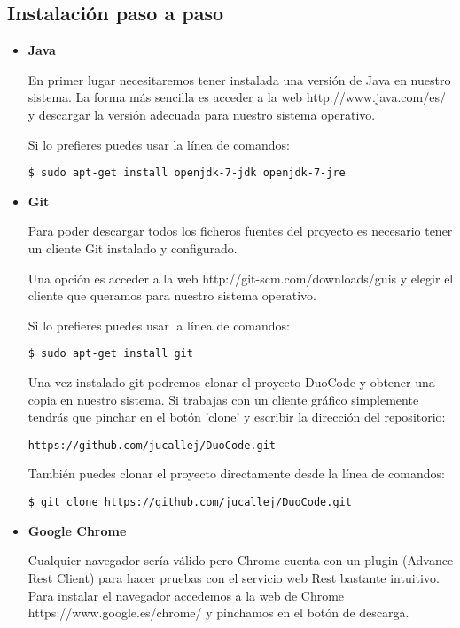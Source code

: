 \subsection{Instalación paso a paso}
\begin{itemize}
\item \textbf{Java}

En primer lugar necesitaremos tener instalada una versión de Java en nuestro sistema. La forma más sencilla es acceder a la web http://www.java.com/es/ y descargar la versión adecuada para nuestro sistema operativo.

Si lo prefieres puedes usar la línea de comandos:
{\codesize
\begin{verbatim}
$ sudo apt-get install openjdk-7-jdk openjdk-7-jre
\end{verbatim}
}


\item \textbf{Git}

Para poder descargar todos los ficheros fuentes del proyecto es necesario tener un cliente Git instalado y configurado.

Una opción es acceder a la web http://git-scm.com/downloads/guis y elegir el cliente que queramos para nuestro sistema operativo. 

Si lo prefieres puedes usar la línea de comandos:

{\codesize
\begin{verbatim}
$ sudo apt-get install git
\end{verbatim}
}

Una vez instalado git podremos clonar el proyecto DuoCode y obtener una copia en nuestro sistema. Si trabajas con un cliente gráfico simplemente tendrás que pinchar en el botón 'clone' y escribir la dirección del repositorio:

{\codesize
\begin{verbatim}
https://github.com/jucallej/DuoCode.git
\end{verbatim}
}

También puedes clonar el proyecto directamente desde la línea de comandos:
{\codesize
\begin{verbatim}
$ git clone https://github.com/jucallej/DuoCode.git
\end{verbatim}
}


\item \textbf{Google Chrome}

Cualquier navegador sería válido pero Chrome cuenta con un plugin (Advance Rest Client) para hacer pruebas con el servicio web Rest bastante intuitivo. Para instalar el navegador accedemos a la web de Chrome https://www.google.es/chrome/ y pinchamos en el botón de descarga.


\end{itemize}

